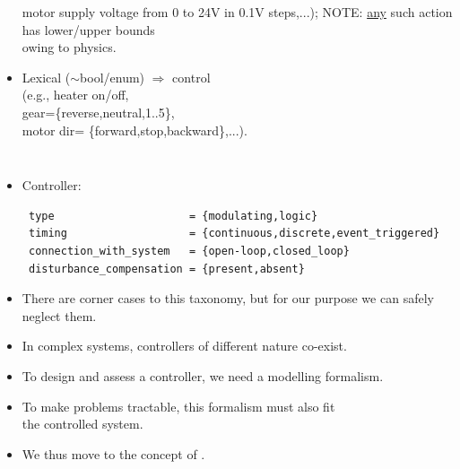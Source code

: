 \begin{frame}
\begin{columns}
\begin{itemize}[<+-| alert@+>]
         motor supply voltage from 0 to 24V in 0.1V steps,...);
         NOTE: \underline{any} such action has lower/upper bounds\\
         owing to physics.
   \item \vspace{10mm}Lexical ($\sim$bool/enum) $\Rightarrow$  control\\
         (e.g., heater on/off,\\
          gear=\{reverse,neutral,1..5\},\\
          motor dir= \{forward,stop,backward\},...).
   \end{itemize}
 \end{columns}
\end{frame}

\begin{frame}[fragile]
\myPause
 \begin{itemize}[<+-| alert@+>]
 \item Controller:\\
         \begin{verbatim}
 type                     = {modulating,logic}
 timing                   = {continuous,discrete,event_triggered}
 connection_with_system   = {open-loop,closed_loop}
 disturbance_compensation = {present,absent}
         \end{verbatim}
 \item \vspace{-5mm}There are corner cases to this taxonomy, but for our purpose we can safely\\
       neglect them.
 \item In complex systems, controllers of different nature co-exist.
 \item \vfill To design and assess a controller, we need a modelling formalism.
 \item To make problems tractable, this formalism must also fit\\
       the controlled system.
 \item We thus move to the concept of .
 \end{itemize}
\end{frame}

